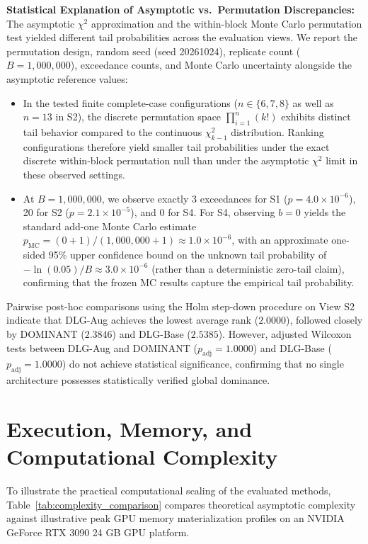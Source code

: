 \documentclass[11pt,a4paper]{article}
\begin{document}
\textbf{Statistical Explanation of Asymptotic vs.\ Permutation Discrepancies:}
The asymptotic $\chi^2$ approximation and the within-block Monte Carlo permutation test yielded different tail probabilities across the evaluation views. We report the permutation design, random seed (seed 20261024), replicate count ($B=1{,}000{,}000$), exceedance counts, and Monte Carlo uncertainty alongside the asymptotic reference values:
\begin{itemize}
    \item In the tested finite complete-case configurations ($n \in \{6, 7, 8\}$ as well as $n=13$ in S2), the discrete permutation space $\prod_{i=1}^n (k!)$ exhibits distinct tail behavior compared to the continuous $\chi^2_{k-1}$ distribution. Ranking configurations therefore yield smaller tail probabilities under the exact discrete within-block permutation null than under the asymptotic $\chi^2$ limit in these observed settings.
    \item At $B=1{,}000{,}000$, we observe exactly 3 exceedances for S1 ($p = 4.0 \times 10^{-6}$), 20 for S2 ($p = 2.1 \times 10^{-5}$), and 0 for S4. For S4, observing $b=0$ yields the standard add-one Monte Carlo estimate $p_{\mathrm{MC}} = (0+1)/(1{,}000{,}000+1) \approx 1.0 \times 10^{-6}$, with an approximate one-sided 95\% upper confidence bound on the unknown tail probability of $-\ln(0.05)/B \approx 3.0 \times 10^{-6}$ (rather than a deterministic zero-tail claim), confirming that the frozen MC results capture the empirical tail probability.
\end{itemize}

Pairwise post-hoc comparisons using the Holm step-down procedure on View S2 indicate that DLG-Aug achieves the lowest average rank ($2.0000$), followed closely by DOMINANT ($2.3846$) and DLG-Base ($2.5385$). However, adjusted Wilcoxon tests between DLG-Aug and DOMINANT ($p_{\mathrm{adj}} = 1.0000$) and DLG-Base ($p_{\mathrm{adj}} = 1.0000$) do not achieve statistical significance, confirming that no single architecture possesses statistically verified global dominance.

\section{Execution, Memory, and Computational Complexity}
\label{sec:execution_complexity}
To illustrate the practical computational scaling of the evaluated methods, Table~\ref{tab:complexity_comparison} compares theoretical asymptotic complexity against illustrative peak GPU memory materialization profiles on an NVIDIA GeForce RTX 3090 24 GB GPU platform.
\end{document}
